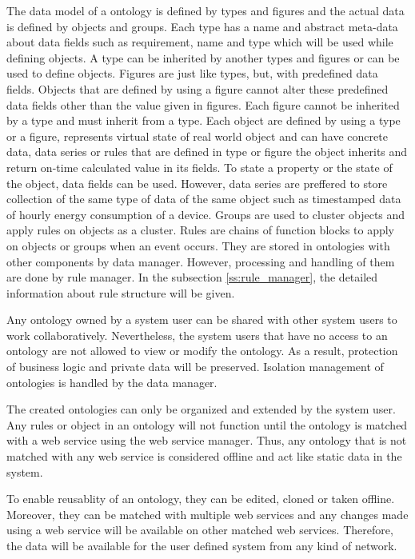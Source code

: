 The data model of a ontology is defined by types and figures and the actual data is defined by objects and groups. Each type has a name and abstract meta-data about data fields such as requirement, name and type which will be used while defining objects. A type can be inherited by another types and figures or can be used to define objects. Figures are just like types, but, with predefined data fields. Objects that are defined by using a figure cannot alter these predefined data fields other than the value given in figures. Each figure cannot be inherited by a type and must inherit from a type. Each object are defined by using a type or a figure, represents virtual state of real world object and can have concrete data, data series or rules that are defined in type or figure the object inherits and return on-time calculated value in its fields. To state a property or the state of the object, data fields can be used. However, data series are preffered to store collection of the same type of data of the same object such as timestamped data of hourly energy consumption of a device. Groups are used to cluster objects and apply rules on objects as a cluster. Rules are chains of function blocks to apply on objects or groups when an event occurs. They are stored in ontologies with other components by data manager. However, processing and handling of them are done by rule manager. In the subsection \ref{ss:rule_manager}, the detailed information about rule structure will be given.

Any ontology owned by a system user can be shared with other system users to work collaboratively. Nevertheless, the system users that have no access to an ontology are not allowed to view or modify the ontology. As a result, protection of business logic and private data will be preserved. Isolation management of ontologies is handled by the data manager. 

The created ontologies can only be organized and extended by the system user. Any rules or object in an ontology will not function until the ontology is matched with a web service using the web service manager. Thus, any ontology that is not matched with any web service is considered offline and act like static data in the system.

To enable reusablity of an ontology, they can be edited, cloned or taken offline. Moreover, they can be matched with multiple web services and any changes made using a web service will be available on other matched web services. Therefore, the data will be available for the user defined system from any kind of network.

